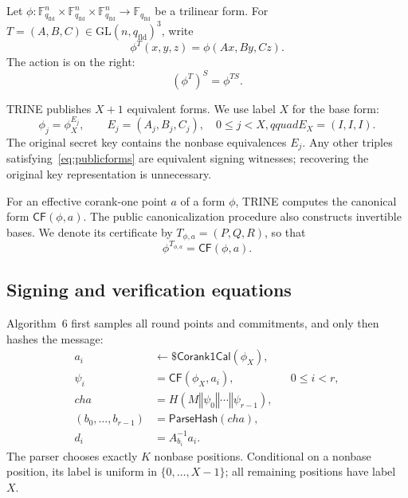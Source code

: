 \documentclass[11pt,a4paper]{article}
\newcommand{\F}{\mathbb F}
\newcommand{\sample}{\mathrel{\leftarrow\$}}
\newcommand{\CF}{\mathsf{CF}}
\newcommand{\Corank}{\mathsf{Corank1Cal}}
\newcommand{\Parse}{\mathsf{ParseHash}}
\newcommand{\qfld}{q_{\mathrm{fld}}}
\begin{document}
Let $\phi:\F_{\qfld}^n\times\F_{\qfld}^n\times\F_{\qfld}^n
\rightarrow\F_{\qfld}$ be a trilinear form.  For
$T=(A,B,C)\in\mathrm{GL}(n,\qfld)^3$, write
\begin{equation}
 \phi^T(x,y,z)=\phi(Ax,By,Cz).                         \label{eq:action}
\end{equation}
The action is on the right:
\begin{equation}
                    (\phi^T)^S=\phi^{TS}.              \label{eq:rightaction}
\end{equation}

TRINE publishes $X+1$ equivalent forms.  We use label $X$ for the base form:
\begin{equation}
  \phi_j=\phi_X^{E_j},\qquad
  E_j=(A_j,B_j,C_j),\quad 0\le j<X,qquad E_X=(I,I,I).
                                                               \label{eq:publicforms}
\end{equation}
The original secret key contains the nonbase equivalences $E_j$.  Any other
triples satisfying~\eqref{eq:publicforms} are equivalent signing witnesses;
recovering the original key representation is unnecessary.

For an effective corank-one point $a$ of a form $\phi$, TRINE computes the
canonical form $\CF(\phi,a)$.  The public canonicalization procedure also
constructs invertible bases.  We denote its certificate by
$T_{\phi,a}=(P,Q,R)$, so that
\begin{equation}
                       \phi^{T_{\phi,a}}=\CF(\phi,a).  \label{eq:certificate}
\end{equation}

\subsection{Signing and verification equations}

Algorithm~6 first samples all round points and commitments, and only then
hashes the message:
\begin{align}
 a_i&\sample\Corank(\phi_X),\nonumber\\
 \psi_i&=\CF(\phi_X,a_i), &&0\le i<r,                  \label{eq:commitments}\\
 \mathit{cha}&=H(M\mathbin\Vert\psi_0\mathbin\Vert\cdots
                    \mathbin\Vert\psi_{r-1}),\nonumber\\
 (b_0,\ldots,b_{r-1})&=\Parse(\mathit{cha}),\nonumber\\
 d_i&=A_{b_i}^{-1}a_i.                                 \label{eq:response}
\end{align}
The parser chooses exactly $K$ nonbase positions.  Conditional on a nonbase
position, its label is uniform in $\{0,\ldots,X-1\}$; all remaining positions
have label $X$.
\end{document}
